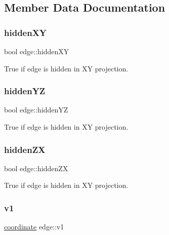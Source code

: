 \subsection{Member Data Documentation}
\mbox{\label{structedge_ac9518793ccbfc62888d64752dd05fcba}} 
\subsubsection{\texorpdfstring{hidden\+XY}{hiddenXY}}
{\footnotesize\ttfamily bool edge\+::hidden\+XY}



True if edge is hidden in XY projection. 

\mbox{\label{structedge_ae634f0360e0a0cfca2cd9491ad327029}} 
\subsubsection{\texorpdfstring{hidden\+YZ}{hiddenYZ}}
{\footnotesize\ttfamily bool edge\+::hidden\+YZ}



True if edge is hidden in XY projection. 

\mbox{\label{structedge_a5942b501b10c47fe01f669aaf1f2763e}} 
\subsubsection{\texorpdfstring{hidden\+ZX}{hiddenZX}}
{\footnotesize\ttfamily bool edge\+::hidden\+ZX}



True if edge is hidden in XY projection. 

\mbox{\label{structedge_aa0be03a8ab19817782042e48a727c146}} 
\subsubsection{\texorpdfstring{v1}{v1}}
{\footnotesize\ttfamily \mbox{\hyperlink{structcoordinate}{coordinate}} edge\+::v1}

